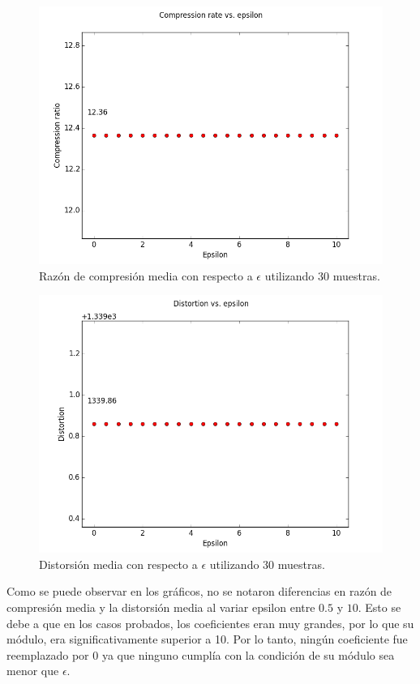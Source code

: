 \documentclass[12pt,a4paper]{article}
\begin{document}
\begin{figure}[H]
\centering
\includegraphics[width=1.0\textwidth]{../graphs/compression_ratio_epsilon.png}
\caption{\label{fig:cr_epsilon} Razón de compresión media con respecto a $\epsilon$ utilizando 30 muestras.}
\end{figure}

\begin{figure}[H]
\centering
\includegraphics[width=1.0\textwidth]{../graphs/distortion_epsilon.png}
\caption{\label{fig:distortion_epsilon} Distorsión media con respecto a $\epsilon$ utilizando 30 muestras.}
\end{figure}

	Como se puede observar en los gráficos, no se notaron diferencias en razón de compresión media y la distorsión media al variar epsilon entre $0.5$ y $10$. Esto se debe a que en los casos probados, los coeficientes eran muy grandes, por lo que su módulo, era significativamente superior a 10. Por lo tanto, ningún coeficiente fue reemplazado por $0$ ya que ninguno  cumplía con la condición de su módulo sea menor que $\epsilon$.
    
\end{document}
